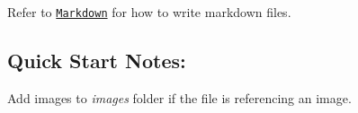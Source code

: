 Refer to \href{http://daringfireball.net/projects/markdown/}{\tt Markdown} for how to write markdown files. \subsection*{Quick Start Notes\+:}


\begin{DoxyEnumerate}
\item Add images to {\itshape images} folder if the file is referencing an image. 
\end{DoxyEnumerate}